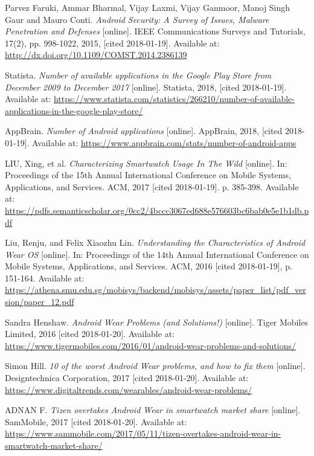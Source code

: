 \begin{thebibliography}{10}
Parvez Faruki, Ammar Bharmal, Vijay Laxmi, Vijay Ganmoor, Manoj Singh Gaur and Mauro Conti. \textit{Android Security: A Survey of Issues, Malware Penetration and Defenses} [online]. IEEE Communications Surveys and Tutorials, 17(2), pp. 998-1022, 2015, [cited 2018-01-19]. Available at: \url{http://dx.doi.org/10.1109/COMST.2014.2386139}

Statista. \textit{Number of available applications in the Google Play Store from December 2009 to December 2017} [online]. Statista, 2018, [cited 2018-01-19]. Available at: \url{https://www.statista.com/statistics/266210/number-of-available-applications-in-the-google-play-store/}

AppBrain. \textit{Number of Android applications} [online]. AppBrain, 2018, [cited 2018-01-19]. Available at: \url{https://www.appbrain.com/stats/number-of-android-apps}

LIU, Xing, et al. \textit{Characterizing Smartwatch Usage In The Wild} [online]. In: Proceedings of the 15th Annual International Conference on Mobile Systems, Applications, and Services. ACM, 2017 [cited 2018-01-19]. p. 385-398. Available at: \url{https://pdfs.semanticscholar.org/0cc2/4bccc3067ed688e576603bc6bab0e5e1b1db.pdf}

Liu, Renju, and Felix Xiaozhu Lin. \textit{Understanding the Characteristics of Android Wear OS} [online]. In: Proceedings of the 14th Annual International Conference on Mobile Systems, Applications, and Services. ACM, 2016 [cited 2018-01-19], p. 151-164. Available at: \url{https://athena.smu.edu.sg/mobisys/backend/mobisys/assets/paper_list/pdf_version/paper_12.pdf}

Sandra Henshaw. \textit{Android Wear Problems (and Solutions!)} [online]. Tiger Mobiles Limited, 2016 [cited 2018-01-20]. Available at: \url{https://www.tigermobiles.com/2016/01/android-wear-problems-and-solutions/}

Simon Hill. \textit{10 of the worst Android Wear problems, and how to fix them} [online]. Designtechnica Corporation, 2017 [cited 2018-01-20]. Available at: \url{https://www.digitaltrends.com/wearables/android-wear-problems/}

ADNAN F. \textit{Tizen overtakes Android Wear in smartwatch market share} [online]. SamMobile, 2017 [cited 2018-01-20]. Available at: \url{https://www.sammobile.com/2017/05/11/tizen-overtakes-android-wear-in-smartwatch-market-share/}



\end{thebibliography}
